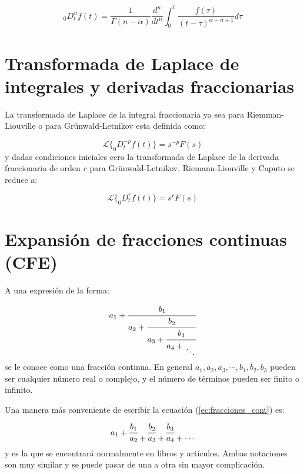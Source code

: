 	\begin{equation}
		_{0}D_{t}^{\alpha}f(t) = \frac{1}{\Gamma(n-\alpha)} \frac{d^{n}}{dt^{n}} \int_{0}^{t} \frac{f(\tau)}{(t - \tau)^{\alpha - n + 1}} d\tau
	\end{equation}
		
	\section{Transformada de Laplace de integrales y derivadas fraccionarias}
	
	La transformada de Laplace de la integral fraccionaria ya sea para Riemman-Liouville o para Grünwald-Letnikov esta definida como:
	
	\begin{equation}
	 	\mathcal{L} \{ _{0}D_{t}^{-p} f(t) \} = s^{-p} F(s)
	\end{equation} 
	y dadas condiciones iniciales cero  la transformada de Laplace de la derivada fraccionaria de orden $r$ para Grünwald-Letnikov, Riemann-Liouville y Caputo se reduce a:
	
	\begin{equation}
		\mathcal{L} \{ _{0}D_{t}^{r} f(t) \} = s^{r} F(s)
	\end{equation}
	
	
	\section{Expansión de fracciones continuas (CFE)}
	
	A una expresión de la forma:

	\begin{equation}
		a_{1} + \cfrac{b_{1}}{a_{2} + \cfrac{b_{2}}{a_{3} + \cfrac{b_{3}}{a_{4} + \genfrac{}{}{0pt}{0}{}{\ddots}}}}
		\label{ec:fracciones_cont}
	\end{equation} 
	se le conoce como una fracción continua. En general $a_{1},a_{2},a_{3}, \cdots, b_{1}, b_{2}, b_{3}$ pueden ser cualquier número real o complejo, y el número de términos pueden ser finito o infinito.

	Una manera más conveniente de escribir la ecuación (\ref{ec:fracciones_cont}) es:

	\begin{equation}
		a_{1} + \frac{b_{1}}{a_{2} } \genfrac{}{}{0pt}{0}{}{+}   \frac{b_{2}}{a_{3}}  \genfrac{}{}{0pt}{0}{}{+}  \frac{b_{3}}{a_{4}}  \genfrac{}{}{0pt}{0}{}{+}  \genfrac{}{}{0pt}{0}{}{\cdots} 
		\label{ec:fracciones_cont_sim}
	\end{equation}
	y es la que se encontrará normalmente en libros y artículos. Ambas notaciones son  muy similar y se puede pasar de una a otra sin mayor complicación.

